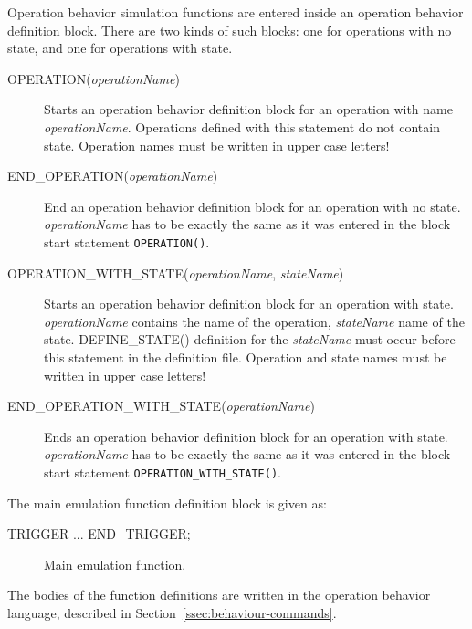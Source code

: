 \documentclass[a4paper,twoside]{tceusermanual}
\begin{document}
Operation behavior simulation functions are entered inside an operation
behavior definition block. There are two kinds of such blocks: one for
operations with no state, and one for operations with state.

\begin{description}
\item[OPERATION(\emph{operationName})] %
  Starts an operation behavior definition block for an operation with name 
  \emph{operationName}. Operations defined with this statement do not 
  contain state. Operation names must be written in upper case letters!
\item[END\_OPERATION(\emph{operationName})] %
  End an operation behavior definition block for an operation with no state.
  \emph{operationName} has to be exactly the same as it was entered in the
  block start statement \verb|OPERATION()|.
\item[OPERATION\_WITH\_STATE(\emph{operationName}, \emph{stateName})] %
  Starts an operation behavior definition block for an operation with state.
  \emph{operationName} contains the name of the operation, \emph{stateName}
  name of the state. DEFINE\_STATE() definition for the \emph{stateName}
must 
  occur before this statement in the definition file. Operation and state
  names must be written in upper case letters!
\item[END\_OPERATION\_WITH\_STATE(\emph{operationName})] %
  Ends an operation behavior definition block for an operation with state.
  \emph{operationName} has to be exactly the same as it was entered in the
  block start statement \verb|OPERATION_WITH_STATE()|.
\end{description}

The main emulation  function definition block is given as:
\begin{description}
\item[TRIGGER ... END\_TRIGGER;] %
  Main emulation function.

\end{description}


The bodies of the function definitions are written in the operation behavior
language, described in Section~\ref{ssec:behaviour-commands}.
\end{document}
